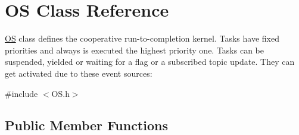 \hypertarget{class_o_s}{\section{O\-S Class Reference}
\label{class_o_s}
}


\hyperlink{class_o_s}{O\-S} class defines the cooperative run-\/to-\/completion kernel. Tasks have fixed priorities and always is executed the highest priority one. Tasks can be suspended, yielded or waiting for a flag or a subscribed topic update. They can get activated due to these event sources\-:  




{\ttfamily \#include $<$O\-S.\-h$>$}

\subsection*{Public Member Functions}

